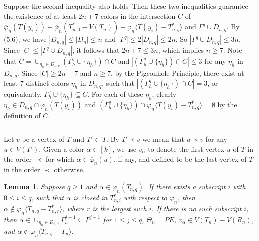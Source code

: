 \documentclass[11pt]{article}
\newtheorem{lemma}[theorem]{Lemma}
\newcommand{\phibar}{\overline{\varphi}}
\def\qed{\hfill \rule{4pt}{7pt}}
\begin{document}
Suppose the second inequality also holds. Then these two inequalities guarantee the existence of at least $2n+7$ colors in
the intersection $C$ of $\overline{\varphi}_n(T(y_i))- \phibar_n(T_{n,0}^*-V(T_n)) - \varphi_n \langle T(y_i) - T_{n,q}^* \rangle 
$ and $\Gamma^{q}\cup D_{n,q}$. By (5.6), we have $|D_{n,q}|\le  |D_{n}| \le n$
and $|\Gamma^{q}| \le 2 |D_{n,q}|\le 2n$. So $|\Gamma^{q}\cup D_{n,q}|\le 3n$. Since $|C|\le |\Gamma^{q}\cup D_{n,q}|$,
it follows that $2n+7 \le 3n$, which implies $n \ge 7$. Note that $C=\cup_{\eta_{h}\in D_{n,q}} (\Gamma^{q}_h \cup \{\eta_{h}\})
\cap C$ and $|(\Gamma^{q}_h \cup \{\eta_{h}\}) \cap C|\le 3$ for any $\eta_{h}$ in $D_{n,q}$. Since $|C|\ge 2n+7$ and $n\ge 7$, 
by the Pigeonhole Principle, there exist at least $7$ distinct colors $\eta_{h}$ in $D_{n,q}$, such that $| (\Gamma^{q}_h \cup 
\{\eta_{h}\}) \cap C|=3$, or equivalently, $\Gamma^{q}_h \cup \{\eta_{h}\} \subseteq C$.  For each of these $\eta_{h}$, clearly 
$\eta_{h}\in D_{n,q}\cap \phibar_n(T(y_i))$ and $(\Gamma^{q}_h \cup \{\eta_{h}\}) \cap \varphi_n \langle T(y_i) - T_{n,q}^* \rangle
=\emptyset$ by the definition of $C$. \qed

\vskip 2mm
Let $v$ be a vertex of $T$ and $T'\subset T$. By $T' \prec v$ we mean that $u \prec v$ for any $u \in V(T')$. Given a 
color $\alpha \in [k]$, we use $v_{\alpha}$ to denote the first vertex $u$ of $T$ in the order $\prec$ for which $\alpha \in 
\overline{\varphi}_n(u)$, if any, and defined to be the last vertex of $T$ in the order $\prec$ otherwise. 

\begin{lemma}\label{rutcor}
Suppose $q\geq 1$ and $\alpha\in \phibar_n(T_{n,q})$. If there exists a subscript $i$ with $0\le i \le q$, 
such that $\alpha$ is closed in $T^*_{n,i}$ with respect to $\varphi_n$,  then $\alpha \notin \varphi_n \langle 
T_{n,q}- T_{n,r}^* \rangle$, where $r$ is the largest such $i$. If there is no such subscript $i$, then 
$\alpha\in \cup_{\eta_h\in D_{n,j}} \Gamma^{j-1}_h \subseteq \Gamma^{j-1}$ for $1 \le j \le q$, 
$\Theta_n=PE$, $v_{\alpha}\in V(T_n)-V(R_n)$, and $\alpha \notin \varphi_n \langle T_{n,q}- T_n \rangle$.  
\end{lemma}
\end{document}
